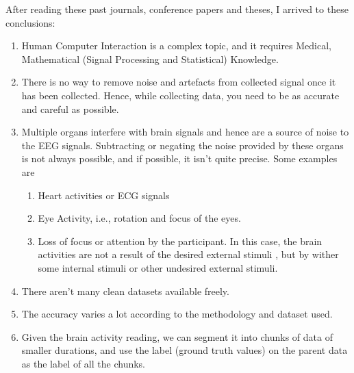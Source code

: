 \begin{itemize}
After reading these past journals, conference papers and theses, I arrived to these conclusions:
\begin{enumerate}
    \item Human Computer Interaction is a complex topic, and it requires Medical, Mathematical (Signal Processing and Statistical) Knowledge.
    \item There is no way to remove noise and artefacts from collected signal once it has been collected. Hence, while collecting data, you need to be as accurate and careful as possible.
    \item Multiple organs interfere with brain signals and hence are a source of noise to the EEG signals. Subtracting or negating the noise provided by these organs is not always possible, and if possible, it isn't quite precise. Some examples are 
    \begin{enumerate}
        \item Heart activities or ECG signals
        \item Eye Activity, i.e., rotation and focus of the eyes.
        \item Loss of focus or attention by the participant. In this case, the brain activities are not a result of the desired external stimuli , but by wither some internal stimuli or other undesired external stimuli.
    \end{enumerate}
    \item There aren't many clean datasets available freely.
    \item The accuracy varies a lot according to the methodology and dataset used.
    \item Given the brain activity reading, we can segment it into chunks of data of smaller durations, and use the label (ground truth values) on the parent data as the label of all the chunks.
\end{enumerate}
\end{itemize}




